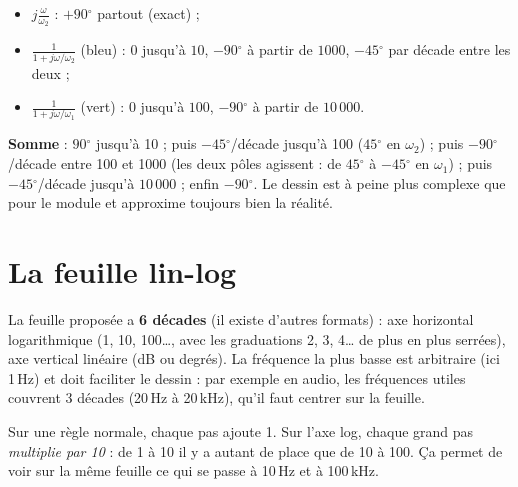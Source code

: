 \begin{exbox}[title={Phase de $\underline H(j\omega) = \frac{j\frac\omega{\omega_2}}{\left(1 + j\frac\omega{\omega_1}\right)\left(1 + j\frac\omega{\omega_2}\right)}$}]
\begin{itemize}
  \item $j\frac\omega{\omega_2}$ : $+90\ensuremath{^\circ}$ partout (exact) ;
  \item $\frac1{1 + j\omega/\omega_2}$ (bleu) : $0$ jusqu'à $10$, $-90\ensuremath{^\circ}$ à partir de
        $1000$, $-45\ensuremath{^\circ}$ par décade entre les deux ;
  \item $\frac1{1 + j\omega/\omega_1}$ (vert) : $0$ jusqu'à $100$, $-90\ensuremath{^\circ}$ à partir de
        $10\,000$.
\end{itemize}
\textbf{Somme} : $90\ensuremath{^\circ}$ jusqu'à 10 ; puis $-45\ensuremath{^\circ}$/décade jusqu'à 100 ($45\ensuremath{^\circ}$ en $\omega_2$) ;
puis $-90\ensuremath{^\circ}$/décade entre 100 et 1000 (les deux pôles agissent : de $45\ensuremath{^\circ}$ à $-45\ensuremath{^\circ}$ en
$\omega_1$) ; puis $-45\ensuremath{^\circ}$/décade jusqu'à $10\,000$ ; enfin $-90\ensuremath{^\circ}$. Le dessin est à peine plus
complexe que pour le module et approxime toujours bien la réalité.
\end{exbox}

\section{La feuille lin-log}


\begin{rembox}[title=Feuille lin--log]
La feuille proposée a \textbf{6 décades} (il existe d'autres formats) : axe horizontal
logarithmique (1, 10, 100\ldots, avec les graduations 2, 3, 4\ldots{} de plus en plus
serrées), axe vertical linéaire (dB ou degrés). La fréquence la plus basse est arbitraire
(ici 1\,Hz) et doit faciliter le dessin : par exemple en audio, les fréquences utiles
couvrent 3 décades (20\,Hz à 20\,kHz), qu'il faut centrer sur la feuille.
\end{rembox}

\begin{goatbox}
Sur une règle normale, chaque pas ajoute 1. Sur l'axe log, chaque grand pas
\emph{multiplie par 10} : de 1 à 10 il y a autant de place que de 10 à 100. Ça permet de voir
sur la même feuille ce qui se passe à 10\,Hz et à 100\,kHz.
\end{goatbox}

